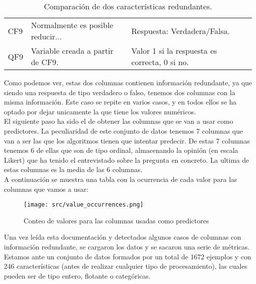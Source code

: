 \begin{table}[H]
	\begin{tabular}{|l|l|l|}
		\cline{1-3}
		CF9 & Normalmente es posible reducir... & Respuesta: Verdadera/Falsa.                   \\ \cline{1-3}
		QF9 & Variable creada a partir de CF9.  & Valor 1 si la respuesta es correcta, 0 si no. \\ \cline{1-3}
	\end{tabular}
	\label{tab:columnas_iguales}
	\caption{Comparación de dos características redundantes.}
\end{table}
Como podemos ver, estas dos columnas contienen información redundante, ya que siendo una respuesta de tipo verdadero o falso, tenemos dos columnas con la misma información. Este caso se repite en varios casos, y en todos ellos se ha optado por dejar unicamente la que tiene los valores numéricos.\\
\linebreak
El siguiente paso ha sido el de obtener las columnas que se van a usar como predictores.
La peculiaridad de este conjunto de datos tenemos 7 columnas que van a ser las que los algoritmos tienen que intentar predecir. De estas 7 columnas tenemos 6 de ellas que son de tipo ordinal, almacenando la opinión (en escala Likert) que ha tenido el entrevistado sobre la pregunta en concreto. La ultima de estas columnas es la media de las 6 columnas.\\
A continuación se muestra una tabla con la ocurrencia de cada valor para las columnas que vamos a usar:\\
\linebreak
\begin{figure}[H]
	\centering
	\texttt{[image: src/value\_occurrences.png]}
	\caption{Conteo de valores para las columnas usadas como predictores}
	\label{tab:ocurrencia_valores}
\end{figure}
Una vez leída esta documentación y detectados algunos casos de columnas con información redundante, se cargaron los datos y se sacaron una serie de métricas. Estamos ante un conjunto de datos formados por un total de 1672 ejemplos y con 246 características (antes de realizar cualquier tipo de procesamiento), las cuales pueden ser de tipo entero, flotante o categóricas.
\pagebreak
